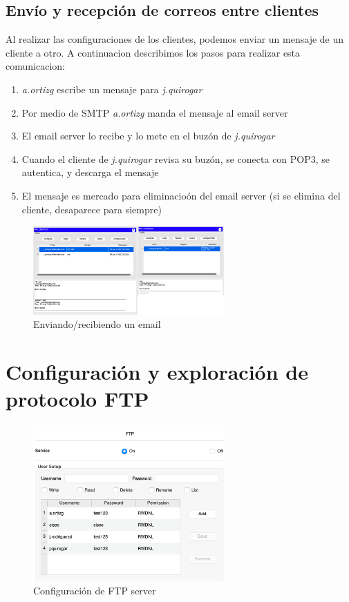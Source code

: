 \documentclass[10pt]{article}
\begin{document}
\subsection{Envío y recepción de correos entre clientes}
Al realizar las configuraciones de los clientes, podemos enviar un mensaje de un cliente a otro. A continuacion describimos los pasos para realizar esta comunicacion:
\begin{enumerate}
\item \textit{a.ortizg} escribe un mensaje para \textit{j.quirogar}
\item Por medio de SMTP \textit{a.ortizg} manda el mensaje al email server
\item El email server lo recibe y lo mete en el buzón de \textit{j.quirogar}
\item Cuando el cliente de \textit{j.quirogar} revisa su buzón, se conecta con POP3, se autentica, y descarga el mensaje
\item El mensaje es mercado para eliminacioón del email server (si se elimina del cliente, desaparece para siempre)
\end{enumerate}


\begin{figure}[H]
    \centering
    \includegraphics[width=0.65\textwidth]{lab-01-screenshots/45-4-send-receive.png}
    \caption{Enviando/recibiendo un email}
\end{figure}

\section{Configuración y exploración de protocolo FTP}

\begin{figure}[H]
    \centering
    \includegraphics[width=0.65\textwidth]{lab-01-screenshots/46-1-ftp-config}
    \caption{Configuración de FTP server}
\end{figure}
\end{document}
